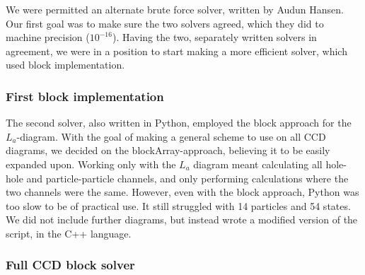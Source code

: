 \documentclass[10pt,twoside]{report}
\begin{document}
	We were permitted an alternate brute force solver, written by Audun Hansen. Our first goal was to make sure the two solvers agreed, which they did to machine precision ($10^{-16}$). Having the two, separately written solvers in agreement, we were in a position to start making a more efficient solver, which used block implementation.
	
	\subsubsection{First block implementation}
	
	The second solver, also written in Python, employed the block approach for the $L_a$-diagram. With the goal of making a general scheme to use on all CCD diagrams, we decided on the blockArray-approach, believing it to be easily expanded upon. Working only with the $L_a$ diagram meant calculating all hole-hole and particle-particle channels, and only performing calculations where the two channels were the same. However, even with the block approach, Python was too slow to be of practical use. It still struggled with 14 particles and 54 states. We did not include further diagrams, but instead wrote a modified version of the script, in the C++ language.
	
	\subsubsection{Full CCD block solver}
	

	
\end{document}
